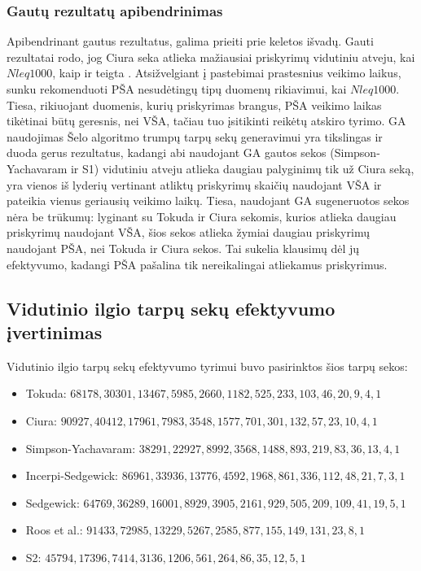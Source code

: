 \documentclass{VUMIFInfKursinis}
\begin{document}
\subsubsection{Gautų rezultatų apibendrinimas}

Apibendrinant gautus rezultatus, galima prieiti prie keletos išvadų.
Gauti rezultatai rodo, jog Ciura seka atlieka mažiausiai priskyrimų vidutiniu atveju, kai $N leq 1000$, kaip ir teigta \cite{ciura2001best}.
Atsižvelgiant į pastebimai prastesnius veikimo laikus, sunku rekomenduoti PŠA nesudėtingų tipų duomenų rikiavimui, kai $N leq 1000$.
Tiesa, rikiuojant duomenis, kurių priskyrimas brangus, PŠA veikimo laikas tikėtinai būtų geresnis, nei VŠA, tačiau tuo įsitikinti reikėtų atskiro tyrimo.  
GA naudojimas Šelo algoritmo trumpų tarpų sekų generavimui yra tikslingas ir duoda gerus rezultatus, kadangi abi naudojant GA gautos sekos (Simpson-Yachavaram ir S1)
vidutiniu atveju atlieka daugiau palyginimų tik už Ciura seką, yra vienos iš lyderių vertinant atliktų priskyrimų skaičių naudojant VŠA ir pateikia vienus geriausių veikimo laikų.
Tiesa, naudojant GA sugeneruotos sekos nėra be trūkumų: lyginant su Tokuda ir Ciura sekomis, kurios atlieka daugiau priskyrimų naudojant VŠA, šios sekos atlieka žymiai daugiau priskyrimų
naudojant PŠA, nei Tokuda ir Ciura sekos. Tai sukelia klausimų dėl jų efektyvumo, kadangi PŠA pašalina tik nereikalingai atliekamus priskyrimus.

\subsection{Vidutinio ilgio tarpų sekų efektyvumo įvertinimas}

Vidutinio ilgio tarpų sekų efektyvumo tyrimui buvo pasirinktos šios tarpų sekos:
\begin{itemize}
  \item Tokuda: $68178,30301,13467,5985,2660,1182,525,233,103,46,20,9,4,1$ \cite{10.5555/645569.659879}
  \item Ciura: $90927,40412,17961,7983,3548,1577,701,301,132,57,23,10,4,1$ \cite{ciura2001best}
  \item Simpson-Yachavaram: $38291,22927,8992,3568,1488,893,219,83,36,13,4,1$ \cite{simpson1999faster}
  \item Incerpi-Sedgewick: $86961,33936,13776,4592,1968,861,336,112,48,21,7,3,1$ \cite{incerpi1985improved}
  \item Sedgewick: $64769,36289,16001,8929,3905,2161,929,505,209,109,41,19,5,1$ \cite{SEDGEWICK1986159}
  \item Roos et al.: $91433,72985,13229,5267,2585,877,155,149,131,23,8,1$ \cite{roos2002genetic}
  \item S2: $45794,17396,7414,3136,1206,561,264,86,35,12,5,1$
\end{itemize}
\end{document}
